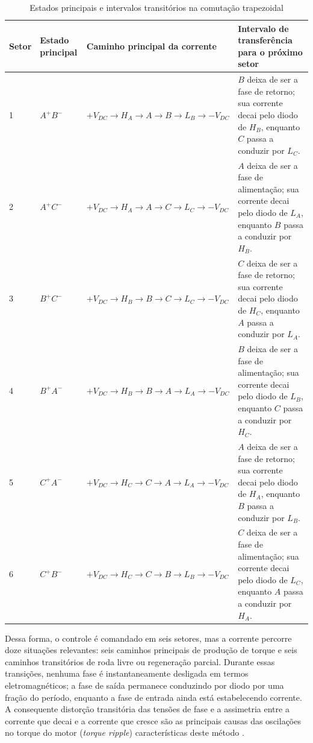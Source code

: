 \begin{table}[htbp]
\centering
\caption{Estados principais e intervalos transitórios na comutação trapezoidal}
\label{tab:subintervalos_comutacao_6step}
\small
\begin{tabular}{@{}p{1.5cm}p{2.2cm}p{4.3cm}p{5.1cm}@{}}
\toprule
Setor & Estado principal & Caminho principal da corrente & Intervalo de transferência para o próximo setor \\
\midrule
1 & $A^+B^-$ & $+V_{DC} \rightarrow H_A \rightarrow A \rightarrow B \rightarrow L_B \rightarrow -V_{DC}$ & $B$ deixa de ser a fase de retorno; sua corrente decai pelo diodo de $H_B$, enquanto $C$ passa a conduzir por $L_C$. \\
2 & $A^+C^-$ & $+V_{DC} \rightarrow H_A \rightarrow A \rightarrow C \rightarrow L_C \rightarrow -V_{DC}$ & $A$ deixa de ser a fase de alimentação; sua corrente decai pelo diodo de $L_A$, enquanto $B$ passa a conduzir por $H_B$. \\
3 & $B^+C^-$ & $+V_{DC} \rightarrow H_B \rightarrow B \rightarrow C \rightarrow L_C \rightarrow -V_{DC}$ & $C$ deixa de ser a fase de retorno; sua corrente decai pelo diodo de $H_C$, enquanto $A$ passa a conduzir por $L_A$. \\
4 & $B^+A^-$ & $+V_{DC} \rightarrow H_B \rightarrow B \rightarrow A \rightarrow L_A \rightarrow -V_{DC}$ & $B$ deixa de ser a fase de alimentação; sua corrente decai pelo diodo de $L_B$, enquanto $C$ passa a conduzir por $H_C$. \\
5 & $C^+A^-$ & $+V_{DC} \rightarrow H_C \rightarrow C \rightarrow A \rightarrow L_A \rightarrow -V_{DC}$ & $A$ deixa de ser a fase de retorno; sua corrente decai pelo diodo de $H_A$, enquanto $B$ passa a conduzir por $L_B$. \\
6 & $C^+B^-$ & $+V_{DC} \rightarrow H_C \rightarrow C \rightarrow B \rightarrow L_B \rightarrow -V_{DC}$ & $C$ deixa de ser a fase de alimentação; sua corrente decai pelo diodo de $L_C$, enquanto $A$ passa a conduzir por $H_A$. \\
\bottomrule
\end{tabular}
\end{table}

 Dessa forma, o controle é comandado em seis setores, mas a corrente percorre doze situações relevantes: seis caminhos principais de produção de torque e seis caminhos transitórios de roda livre ou regeneração parcial. Durante essas transições, nenhuma fase é instantaneamente desligada em termos eletromagnéticos; a fase de saída permanece conduzindo por diodo por uma fração do período, enquanto a fase de entrada ainda está estabelecendo corrente. A consequente distorção transitória das tensões de fase e a assimetria entre a corrente que decai e a corrente que cresce são as principais causas das oscilações no torque do motor (\textit{torque ripple}) características deste método \cite{kim2017electric, jahns1996pulsating}.
 
